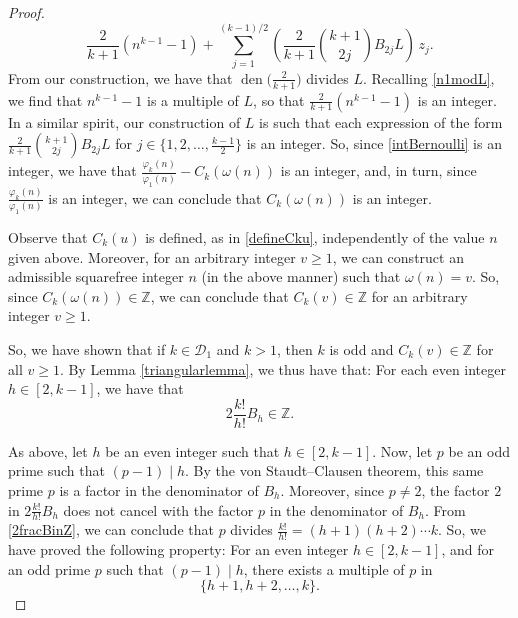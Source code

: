 \documentclass[12pt]{article}
\begin{document}
\begin{proof}
\begin{equation}\label{intBernoulli} 
 \frac{2 }{k+1} (n^{k-1}-1) + 
 \sum_{j=1}^{(k-1)/2} \left( \frac{2 }{k+1} \binom{k+1}{2j} B_{2j} L \right) \, z_j. 
\end{equation}
 From our construction, we have that $\operatorname{den}\big( \frac{2}{k+1} \big)$ divides $L$. Recalling \eqref{n1modL}, we find that 
 $n^{k-1}-1$ is a multiple of $L$, so that $\frac{2}{k+1} (n^{k-1}-1)$ is an integer. In a similar spirit, our construction of $L$ is such that 
 each expression of the form $ \frac{2 }{k+1} \binom{k+1}{2j} B_{2j} L$ for $j \in \big\{ 1, 2, \ldots, \frac{k-1}{2} \big\}$
 is an integer. So, since \eqref{intBernoulli} is an integer, 
 we have that $ \frac{ \varphi_k(n) }{ \varphi_1(n) } - C_k(\omega(n))$ is an integer, 
 and, in turn, since $ \frac{ \varphi_k(n) }{ \varphi_1(n) } $ is an integer, 
 we can conclude that $C_{k}(\omega(n))$ is an integer. 

    Observe that  $C_k(u)$ is defined, as in \eqref{defineCku}, independently of the value $n$ given above. 
 Moreover, for an arbitrary integer $v \geq 1$, we can construct an admissible squarefree integer $n$ (in the above manner)
 such that $\omega(n) = v$. So, since $C_{k}(\omega(n)) \in \mathbb{Z}$, we can conclude that 
 $C_{k}(v) \in \mathbb{Z}$ for an arbitrary integer $v \geq 1$. 
 
 So, we have shown that if $k \in \mathcal{D}_{1}$ and $k > 1$, then $k$ is odd and $C_{k}(v) \in \mathbb{Z}$ for all $v \geq 1$. By Lemma 
 \ref{triangularlemma}, we thus have that: For each even integer $h \in [2, k-1]$, 
 we have that 
\begin{equation}\label{2fracBinZ} 
 2 \frac{k!}{h!} B_{h} \in \mathbb{Z}. 
\end{equation}
 
 As above, let $h$ be an even integer such that $h \in [2, k-1]$. 
 Now, let $p$ be an odd prime such that $(p-1) \mid h$. 
 By the von Staudt--Clausen theorem, this same prime $p$
 is a factor in the denominator of $B_{h}$. Moreover, since $p \neq 2$, 
 the factor $2$ in 
 $2 \frac{k!}{h!} B_{h} $ does not cancel with the factor $p$ in the denominator of $B_{h}$. 
 From \eqref{2fracBinZ}, we can conclude that 
 $p$ divides $\frac{k!}{h!} = (h+1)(h+2) \cdots k$. 
 So, we have proved the following property: 
 For an even integer $h \in [2, k-1]$, and for an odd prime $p$
 such that $(p-1) \mid h$, there exists a multiple of $p$ in 
\begin{equation}\label{displayinterval}
 \{ h+1, h+2, \ldots, k \}. 
\end{equation}
 

\end{proof}
\end{document}
